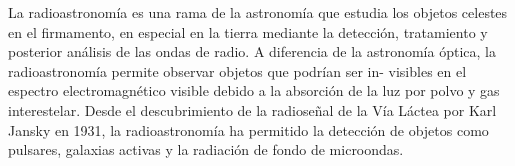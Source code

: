 La radioastronomía es una rama de la astronomía que estudia los objetos celestes
en el firmamento, en especial en la tierra mediante la detección, tratamiento
y posterior análisis de las ondas de radio.
A diferencia de la astronomía óptica, la radioastronomía permite observar
objetos que podrían ser in- visibles en el espectro electromagnético visible
debido a la absorción de la luz por polvo y gas interestelar. Desde el
descubrimiento de la radioseñal de la Vía Láctea por Karl Jansky en 1931, la
radioastronomía ha permitido la detección de objetos como pulsares, galaxias
activas y la radiación de fondo de microondas.
